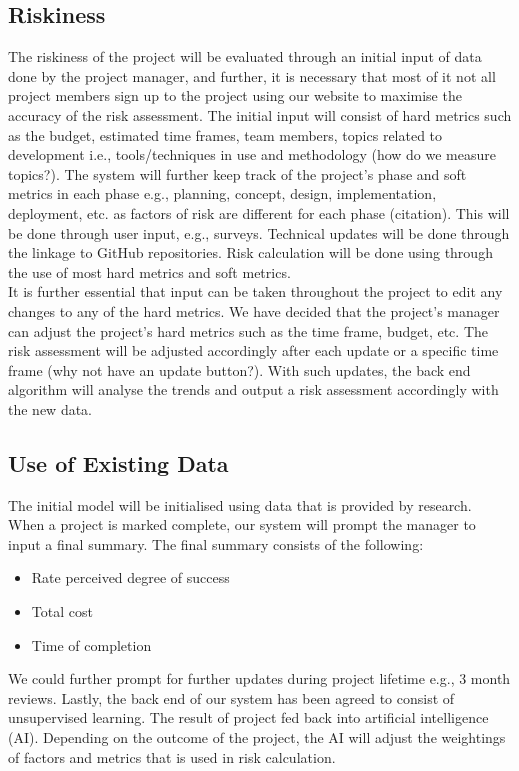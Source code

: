 \documentclass[a4paper]{article}
\theoremstyle{plain}
\theoremstyle{definition}
\theoremstyle{remark}
\begin{document}
\subsection{Riskiness}
The riskiness of the project will be evaluated through an initial input of data done by the project manager, and further, it is necessary that most of it not all project members sign up to the project using our website to maximise the accuracy of the risk assessment. The initial input will consist of hard metrics such as the budget, estimated time frames, team members, topics related to development i.e., tools/techniques in use and methodology (how do we measure topics?). The system will further keep track of the project's phase and soft metrics in each phase e.g., planning, concept, design, implementation, deployment, etc. as factors of risk are different for each phase (citation). This will be done through user input, e.g., surveys. Technical updates will be done through the linkage to GitHub repositories. Risk calculation will be done using through the use of most hard metrics and soft metrics.\\

\noindent It is further essential that input can be taken throughout the project to edit any changes to any of the hard metrics. We have decided that the project's manager can adjust the project's hard metrics such as the time frame, budget, etc. The risk assessment will be adjusted accordingly after each update or a specific time frame (why not have an update button?). With such updates, the back end algorithm will analyse the trends and output a risk assessment accordingly with the new data.

\subsection{Use of Existing Data}
The initial model will be initialised using data that is provided by research. When a project is marked complete, our system will prompt the manager to input a final summary. The final summary consists of the following:
\begin{itemize}
	\item Rate perceived degree of success
	\item Total cost
	\item Time of completion
\end{itemize}
We could further prompt for further updates during project lifetime e.g., 3 month reviews. Lastly, the back end of our system has been agreed to consist of unsupervised learning. The result of project fed back into artificial intelligence (AI). Depending on the outcome of the project, the AI will adjust the weightings of factors and metrics that is used in risk calculation. \\
\end{document}
